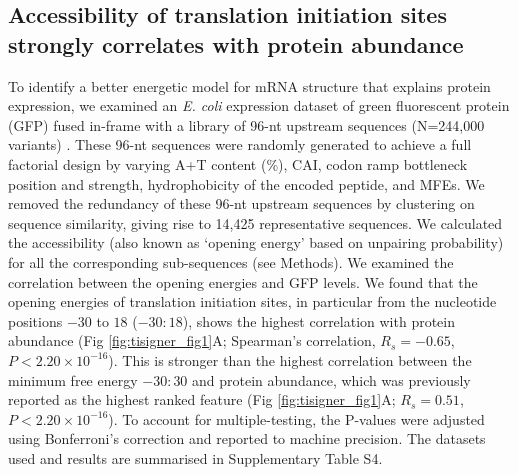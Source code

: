 \subsection{Accessibility of translation initiation sites strongly correlates with protein abundance}
To identify a better energetic model for mRNA structure that explains protein expression, we examined an \textit{E. coli} expression dataset of green fluorescent protein (GFP) fused in-frame with a library of 96-nt upstream sequences (N=244,000 variants) \cite{Cambray2018-kn}. These 96-nt sequences were randomly generated to achieve a full factorial design by varying A+T content (\%), CAI, codon ramp bottleneck position and strength, hydrophobicity of the encoded peptide, and MFEs. We removed the redundancy of these 96-nt upstream sequences by clustering on sequence similarity, giving rise to 14,425 representative sequences. We calculated the accessibility (also known as ‘opening energy’ based on unpairing probability) for all the corresponding sub-sequences (see Methods). We examined the correlation between the opening energies and GFP levels. We found that the opening energies of translation initiation sites, in particular from the nucleotide positions $−30$ to $18$ ($−30:18$), shows the highest correlation with protein abundance (Fig \ref{fig:tisigner_fig1}A; Spearman’s correlation, $R_s = -0.65$, $P < 2.20 \times 10^{-16}$). This is stronger than the highest correlation between the minimum free energy $−30:30$ and protein abundance, which was previously reported as the highest ranked feature (Fig \ref{fig:tisigner_fig1}A; $R_s = 0.51$, $P < 2.20 \times 10^{-16}$). To account for multiple-testing, the P-values were adjusted using Bonferroni's correction and reported to machine precision. The datasets used and results are summarised in Supplementary Table S4.

